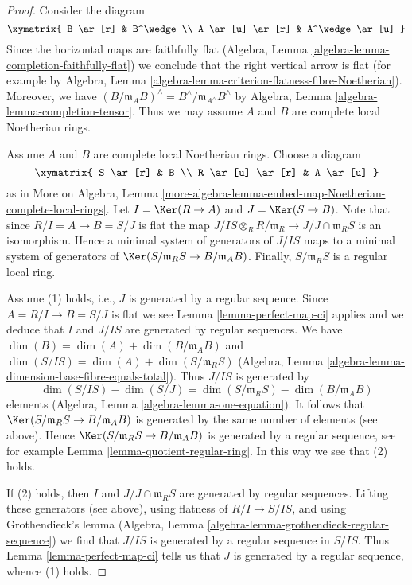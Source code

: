 \begin{proof}
Consider the diagram
$$
\xymatrix{
B \ar[r] & B^\wedge \\
A \ar[u] \ar[r] & A^\wedge \ar[u]
}
$$
Since the horizontal maps are faithfully flat
(Algebra, Lemma \ref{algebra-lemma-completion-faithfully-flat})
we conclude that the right vertical arrow is flat
(for example by Algebra, Lemma
\ref{algebra-lemma-criterion-flatness-fibre-Noetherian}).
Moreover, we have
$(B/\mathfrak m_A B)^\wedge = B^\wedge/\mathfrak m_{A^\wedge} B^\wedge$
by Algebra, Lemma \ref{algebra-lemma-completion-tensor}.
Thus we may assume $A$ and $B$ are complete local Noetherian rings.

\medskip\noindent
Assume $A$ and $B$ are complete local Noetherian rings.
Choose a diagram
$$
\xymatrix{
S \ar[r] & B \\
R \ar[u] \ar[r] & A \ar[u]
}
$$
as in More on Algebra, Lemma
\ref{more-algebra-lemma-embed-map-Noetherian-complete-local-rings}.
Let $I = \Ker(R \to A)$ and $J = \Ker(S \to B)$.
Note that since $R/I = A \to B = S/J$ is flat the map
$J/IS \otimes_R R/\mathfrak m_R \to J/J \cap \mathfrak m_R S$
is an isomorphism. Hence a minimal system of generators of $J/IS$
maps to a minimal system of generators of
$\Ker(S/\mathfrak m_R S \to B/\mathfrak m_A B)$.
Finally, $S/\mathfrak m_R S$ is a regular local ring.

\medskip\noindent
Assume (1) holds, i.e., $J$ is generated by a regular sequence.
Since $A = R/I \to B = S/J$ is flat we see
Lemma \ref{lemma-perfect-map-ci} applies and we deduce
that $I$ and $J/IS$ are generated by regular sequences.
We have $\dim(B) = \dim(A) + \dim(B/\mathfrak m_A B)$ and
$\dim(S/IS) = \dim(A) + \dim(S/\mathfrak m_R S)$
(Algebra, Lemma \ref{algebra-lemma-dimension-base-fibre-equals-total}).
Thus $J/IS$ is generated by
$$
\dim(S/IS) - \dim(S/J) = \dim(S/\mathfrak m_R S) - \dim(B/\mathfrak m_A B)
$$
elements (Algebra, Lemma \ref{algebra-lemma-one-equation}).
It follows that $\Ker(S/\mathfrak m_R S \to B/\mathfrak m_A B)$
is generated by the same number of elements (see above).
Hence $\Ker(S/\mathfrak m_R S \to B/\mathfrak m_A B)$
is generated by a regular sequence, see for example
Lemma \ref{lemma-quotient-regular-ring}.
In this way we see that (2) holds.

\medskip\noindent
If (2) holds, then $I$ and $J/J \cap \mathfrak m_RS$
are generated by regular sequences. Lifting these generators
(see above), using flatness of $R/I \to S/IS$,
and using Grothendieck's lemma
(Algebra, Lemma \ref{algebra-lemma-grothendieck-regular-sequence})
we find that $J/IS$ is generated by a regular sequence in $S/IS$.
Thus Lemma \ref{lemma-perfect-map-ci} tells us that $J$
is generated by a regular sequence, whence (1) holds.
\end{proof}

